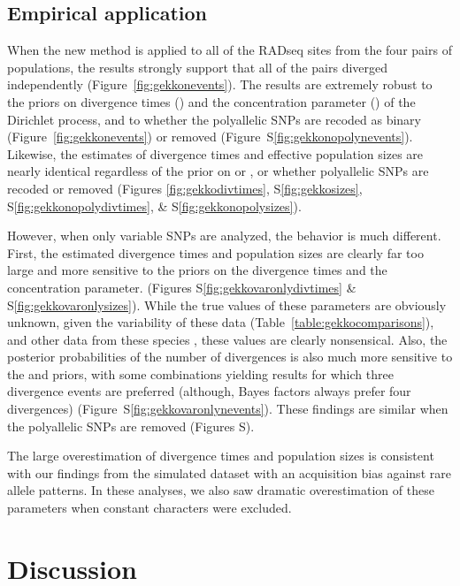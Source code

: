 \subsection{Empirical application}

When the new method is applied to all of the RADseq sites from the
four pairs of  populations, the results strongly
support that all of the pairs diverged independently
(Figure~\ref{fig:gekkonevents}).
The results are extremely robust to the priors on divergence times (\divtime)
and the concentration parameter (\concentration) of the Dirichlet process, and
to whether the polyallelic SNPs are recoded as binary
(Figure~\ref{fig:gekkonevents})
or removed
(Figure~S\ref{fig:gekkonopolynevents}).
Likewise, the estimates of divergence times and effective population sizes
are nearly identical regardless of the prior on \divtime or \concentration,
or whether polyallelic SNPs are recoded or removed
(Figures
\ref{fig:gekkodivtimes},
S\ref{fig:gekkosizes},
S\ref{fig:gekkonopolydivtimes},
\&
S\ref{fig:gekkonopolysizes}).

However, when only variable SNPs are analyzed, the behavior is much different.
First, the estimated divergence times and population sizes are clearly far too
large and more sensitive to the priors on the divergence times and the
concentration parameter.
(Figures
S\ref{fig:gekkovaronlydivtimes}
\&
S\ref{fig:gekkovaronlysizes}).
While the true values of these parameters are obviously unknown, given the
variability of these data (Table~\ref{table:gekkocomparisons}), and other data
from these species \citep{Siler2012, Siler2014kikuchii}, these values are
clearly nonsensical.
Also, the posterior probabilities of the number of divergences is also
much more sensitive to the \divtime and \concentration priors,
with some combinations yielding results for which three divergence events
are preferred (although, Bayes factors always prefer four divergences)
(Figure~S\ref{fig:gekkovaronlynevents}).
These findings are similar when the polyallelic SNPs are removed
(Figures
S).

The large overestimation of divergence times and population sizes is consistent
with our findings from the simulated dataset with an acquisition bias against
rare allele patterns.
In these analyses, we also saw dramatic overestimation of these parameters when
constant characters were excluded.

\section{Discussion}
